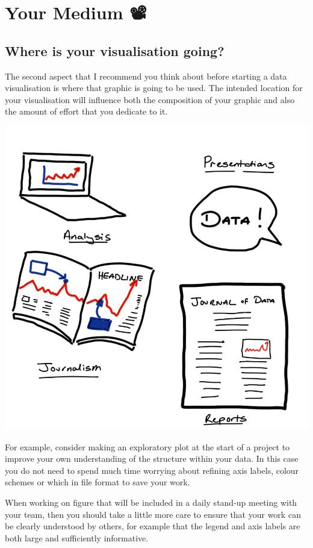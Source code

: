 \documentclass[
  12pt,
]{book}
\begin{document}
\hypertarget{your-medium}{%
\section{Your Medium 📽}\label{your-medium}}

\hypertarget{where-is-your-visualisation-going}{%
\subsection{Where is your visualisation going?}\label{where-is-your-visualisation-going}}

The second aspect that I recommend you think about before starting a data visualisation is where that graphic is going to be used. The intended location for your visualisation will influence both the composition of your graphic and also the amount of effort that you dedicate to it.

\includegraphics{images/303-data-visualisation/visualisation-purposes.png}

For example, consider making an exploratory plot at the start of a project to improve your own understanding of the structure within your data. In this case you do not need to spend much time worrying about refining axis labels, colour schemes or which in file format to save your work.

When working on figure that will be included in a daily stand-up meeting with your team, then you should take a little more care to ensure that your work can be clearly understood by others, for example that the legend and axis labels are both large and sufficiently informative.
\end{document}
